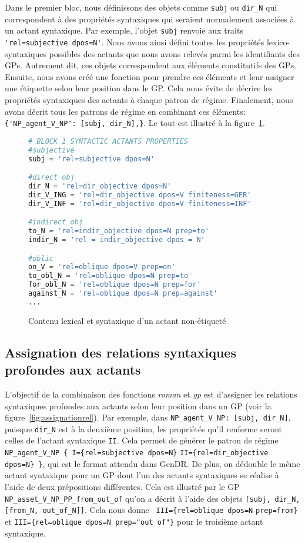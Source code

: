 Dans le premier bloc, nous définissons des objets comme \texttt{subj} ou \texttt{dir\_N} qui correspondent à des propriétés syntaxiques qui seraient normalement associées à un actant syntaxique. Par exemple, l'objet \texttt{subj} renvoie aux traits \lstinline|'rel=subjective dpos=N'|. Nous avons ainsi défini toutes les propriétés lexico-syntaxiques possibles des actants que nous avons relevés parmi les identifiants des \acp{GP}. Autrement dit, ces objets correspondent aux éléments constitutifs des \acp{GP}. Ensuite, nous avons créé une fonction pour prendre ces éléments et leur assigner une étiquette selon leur position dans le \ac{GP}. Cela nous évite de décrire les propriétés syntaxiques des actants à chaque patron de régime. Finalement, nous avons décrit tous les patrons de régime en combinant ces éléments: \lstinline|{'NP_agent_V_NP': [subj, dir_N],}|. Le tout est illustré à la figure~\ref{fig:contenulexical}.

\begin{figure}[htb]
  \caption{Contenu lexical et syntaxique d'un actant non-étiqueté}
	\label{fig:contenulexical}
\begin{lstlisting}[language=Python]
# BLOCK 1 SYNTACTIC ACTANTS PROPERTIES
#subjective
subj = 'rel=subjective dpos=N'

#direct obj
dir_N = 'rel=dir_objective dpos=N'
dir_V_ING = 'rel=dir_objective dpos=V finiteness=GER'
dir_V_INF = 'rel=dir_objective dpos=V finiteness=INF'

#indirect obj
to_N = 'rel=indir_objective dpos=N prep=to'
indir_N = 'rel = indir_objective dpos = N'

#oblic
on_V = 'rel=oblique dpos=V prep=on'
to_obl_N = 'rel=oblique dpos=N prep=to' 
for_obl_N = 'rel=oblique dpos=N prep=for'
against_N = 'rel=oblique dpos=N prep=against'
...
\end{lstlisting}
\end{figure}

\subsection{Assignation des relations syntaxiques profondes aux actants}

L'objectif de la combinaison des fonctions \emph{roman} et \emph{gp} est d'assigner les relations syntaxiques profondes aux actants selon leur position dans un \ac{GP} (voir la figure~\ref{fig:assignationrel}). Par exemple, dans \lstinline|NP_agent_V_NP: [subj, dir_N]|, puisque \texttt{dir\_N} est à la deuxième position, les propriétés qu'il renferme seront celles de l'actant syntaxique \texttt{II}. Cela permet de générer le patron de régime \lstinline|NP_agent_V_NP { I={rel=subjective dpos=N}| \lstinline|II={rel=dir_objective dpos=N} }|, qui est le format attendu dans GenDR. De plus, on dédouble le même actant syntaxique pour un \ac{GP} dont l'un des actants syntaxiques se réalise à l'aide de deux prépositions différentes. Cela est illustré par le \ac{GP} \lstinline|NP_asset_V_NP_PP_from_out_of| qu'on a décrit à l'aide des objets \lstinline|[subj, dir_N, [from_N, out_of_N]]|. Cela nous donne \lstinline| III={rel=oblique dpos=N| \lstinline|prep=from}| et \lstinline|III={rel=oblique dpos=N prep="out of"}| pour le troisième actant syntaxique.

